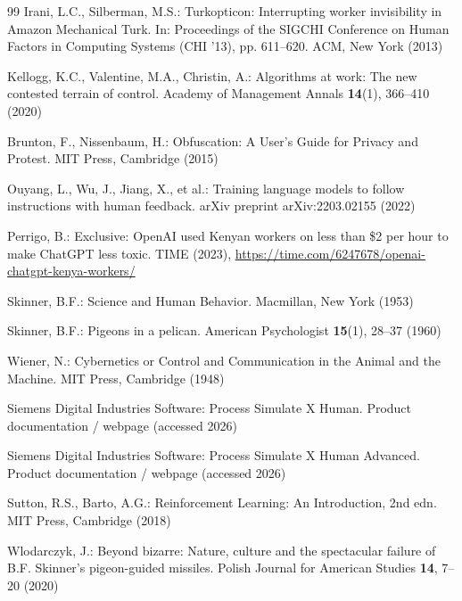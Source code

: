 \documentclass[runningheads]{llncs}
\begin{document}
\begin{thebibliography}{99}
Irani, L.C., Silberman, M.S.: Turkopticon: Interrupting worker invisibility in Amazon Mechanical Turk. In: Proceedings of the SIGCHI Conference on Human Factors in Computing Systems (CHI '13), pp. 611--620. ACM, New York (2013)

Kellogg, K.C., Valentine, M.A., Christin, A.: Algorithms at work: The new contested terrain of control. Academy of Management Annals \textbf{14}(1), 366--410 (2020)

Brunton, F., Nissenbaum, H.: Obfuscation: A User's Guide for Privacy and Protest. MIT Press, Cambridge (2015)

Ouyang, L., Wu, J., Jiang, X., et al.: Training language models to follow instructions with human feedback. arXiv preprint arXiv:2203.02155 (2022)

Perrigo, B.: Exclusive: OpenAI used Kenyan workers on less than \$2 per hour to make ChatGPT less toxic. TIME (2023), \url{https://time.com/6247678/openai-chatgpt-kenya-workers/}

Skinner, B.F.: Science and Human Behavior. Macmillan, New York (1953)

Skinner, B.F.: Pigeons in a pelican. American Psychologist \textbf{15}(1), 28--37 (1960)

Wiener, N.: Cybernetics or Control and Communication in the Animal and the Machine. MIT Press, Cambridge (1948)

Siemens Digital Industries Software: Process Simulate X Human. Product documentation / webpage (accessed 2026)

Siemens Digital Industries Software: Process Simulate X Human Advanced. Product documentation / webpage (accessed 2026)

Sutton, R.S., Barto, A.G.: Reinforcement Learning: An Introduction, 2nd edn. MIT Press, Cambridge (2018)

Wlodarczyk, J.: Beyond bizarre: Nature, culture and the spectacular failure of B.F. Skinner's pigeon-guided missiles. Polish Journal for American Studies \textbf{14}, 7--20 (2020)

\end{thebibliography}
\end{document}
